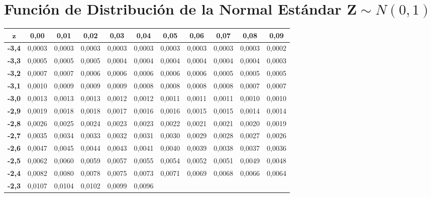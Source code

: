 \documentclass[a4paper]{article}
\begin{document}
\section*{Función de Distribución de la Normal Estándar $\boldsymbol Z\sim N(0,1)$}
\begin{center}
\Large
\begin{tabular}{|r||r|r|r|r|r|r|r|r|r|r|}
\hline
\multicolumn{1}{|c||}{$\mathbf{z}$}& 
\multicolumn{1}{c|}{\textbf{0,00}}& 
\multicolumn{1}{c|}{\textbf{0,01}}& 
\multicolumn{1}{c|}{\textbf{0,02}}& 
\multicolumn{1}{c|}{\textbf{0,03}}& 
\multicolumn{1}{c|}{\textbf{0,04}}& 
\multicolumn{1}{c|}{\textbf{0,05}}& 
\multicolumn{1}{c|}{\textbf{0,06}}&
\multicolumn{1}{c|}{\textbf{0,07}}&
\multicolumn{1}{c|}{\textbf{0,08}}&
\multicolumn{1}{c|}{\textbf{0,09}}\\
\hline\hline
\textbf{-3,4}& 
0,0003& 
0,0003& 
0,0003& 
0,0003& 
0,0003& 
0,0003& 
0,0003& 
0,0003& 
0,0003& 
0,0002 \\
\hline
\textbf{-3,3}& 
0,0005& 
0,0005& 
0,0005& 
0,0004& 
0,0004& 
0,0004& 
0,0004& 
0,0004& 
0,0004& 
0,0003 \\
\hline
\textbf{-3,2}& 
0,0007& 
0,0007& 
0,0006& 
0,0006& 
0,0006& 
0,0006& 
0,0006& 
0,0005& 
0,0005& 
0,0005 \\
\hline
\textbf{-3,1}& 
0,0010& 
0,0009& 
0,0009& 
0,0009& 
0,0008& 
0,0008& 
0,0008& 
0,0008& 
0,0007& 
0,0007 \\
\hline
\textbf{-3,0}& 
0,0013& 
0,0013& 
0,0013& 
0,0012& 
0,0012& 
0,0011& 
0,0011& 
0,0011& 
0,0010& 
0,0010 \\
\hline
\textbf{-2,9}& 
0,0019& 
0,0018& 
0,0018& 
0,0017& 
0,0016& 
0,0016& 
0,0015& 
0,0015& 
0,0014& 
0,0014 \\
\hline
\textbf{-2,8}& 
0,0026& 
0,0025& 
0,0024& 
0,0023& 
0,0023& 
0,0022& 
0,0021& 
0,0021& 
0,0020& 
0,0019 \\
\hline
\textbf{-2,7}& 
0,0035& 
0,0034& 
0,0033& 
0,0032& 
0,0031& 
0,0030& 
0,0029& 
0,0028& 
0,0027& 
0,0026 \\
\hline
\textbf{-2,6}& 
0,0047& 
0,0045& 
0,0044& 
0,0043& 
0,0041& 
0,0040& 
0,0039& 
0,0038& 
0,0037& 
0,0036 \\
\hline
\textbf{-2,5}& 
0,0062& 
0,0060& 
0,0059& 
0,0057& 
0,0055& 
0,0054& 
0,0052& 
0,0051& 
0,0049& 
0,0048 \\
\hline
\textbf{-2,4}& 
0,0082& 
0,0080& 
0,0078& 
0,0075& 
0,0073& 
0,0071& 
0,0069& 
0,0068& 
0,0066& 
0,0064 \\
\hline
\textbf{-2,3}& 
0,0107& 
0,0104& 
0,0102& 
0,0099& 
0,0096& 

\end{tabular}
\end{center}
\end{document}
